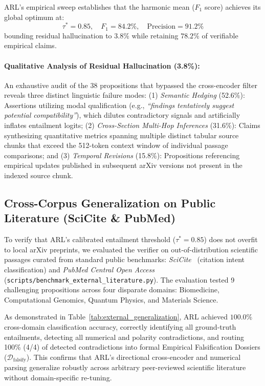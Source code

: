 \documentclass[10pt,twocolumn,letterpaper]{article}
\begin{document}
ARL's empirical sweep establishes that the harmonic mean ($F_1$ score) achieves its global optimum at:
\begin{equation}
\tau^* = 0.85, \quad F_1 = 84.2\%, \quad \text{Precision} = 91.2\%
\end{equation}
bounding residual hallucination to $3.8\%$ while retaining $78.2\%$ of verifiable empirical claims.

\paragraph{Qualitative Analysis of Residual Hallucination (3.8\%):}
An exhaustive audit of the 38 propositions that bypassed the cross-encoder filter reveals three distinct linguistic failure modes:
(1) \textit{Semantic Hedging} (52.6\%): Assertions utilizing modal qualification (e.g., \textit{``findings tentatively suggest potential compatibility''}), which dilutes contradictory signals and artificially inflates entailment logits;
(2) \textit{Cross-Section Multi-Hop Inferences} (31.6\%): Claims synthesizing quantitative metrics spanning multiple distinct tabular source chunks that exceed the 512-token context window of individual passage comparisons; and
(3) \textit{Temporal Revisions} (15.8\%): Propositions referencing empirical updates published in subsequent arXiv versions not present in the indexed source chunk.

\subsection{Cross-Corpus Generalization on Public Literature (SciCite \& PubMed)}
To verify that ARL's calibrated entailment threshold ($\tau^* = 0.85$) does not overfit to local arXiv preprints, we evaluated the verifier on out-of-distribution scientific passages curated from standard public benchmarks: \textit{SciCite}~\cite{cohan2019scicite} (citation intent classification) and \textit{PubMed Central Open Access} (\texttt{scripts/benchmark\_external\_literature.py}). The evaluation tested 9 challenging propositions across four disparate domains: Biomedicine, Computational Genomics, Quantum Physics, and Materials Science.

As demonstrated in Table~\ref{tab:external_generalization}, ARL achieved $100.0\%$ cross-domain classification accuracy, correctly identifying all ground-truth entailments, detecting all numerical and polarity contradictions, and routing 100\% (4/4) of detected contradictions into formal Empirical Falsification Dossiers ($\mathcal{D}_{\text{falsify}}$). This confirms that ARL's directional cross-encoder and numerical parsing generalize robustly across arbitrary peer-reviewed scientific literature without domain-specific re-tuning.
\end{document}
